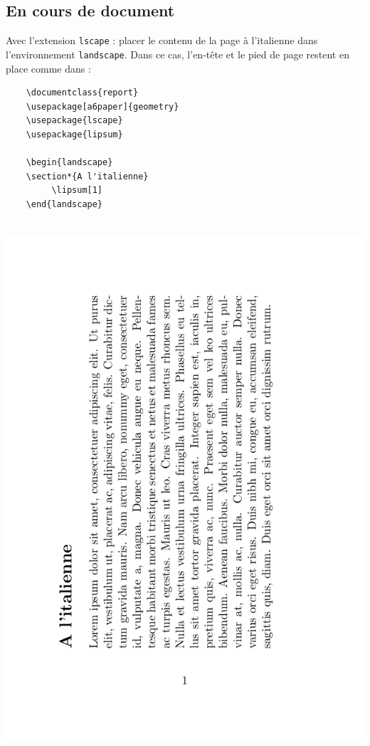 \subsection{En cours de document}

Avec l'extension \texttt{lscape} : placer le contenu de la page à l'italienne dans l'environnement \texttt{landscape}. Dans ce cas, l'en-tête et le pied de page restent en place comme dans :

\vspace*{1em}
\begin{minipage}{.48\linewidth}
    \begin{verbatim}
    \documentclass{report}
    \usepackage[a6paper]{geometry}
    \usepackage{lscape}
    \usepackage{lipsum}
    
    \begin{landscape}
    \section*{A l'italienne}
         \lipsum[1]
    \end{landscape}
    
    \end{verbatim}
\end{minipage}
\begin{boxedminipage}{.48\linewidth}
	\includegraphics[width=\linewidth]{images/choix_extensions_exemple_lscape}
\end{boxedminipage}



